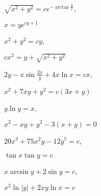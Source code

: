 \documentclass[11pt]{amsbook}
\begin{document}
\begin{hEnumerateArabic}
\item
  \begin{multicols}{2}
    \begin{hEnumerateAlpha}
      \item $\sqrt{x^2 + y^2} = ce^{-\arctan \frac{y}{x}}$,
      \item $x = ye^{cy+1}$
    \end{hEnumerateAlpha}
  \end{multicols}

\item
  \begin{multicols}{2}
    \begin{hEnumerateAlpha}
      \item $x^2 + y^2 = cy$,
      \item $cx^2 = y + \sqrt{x^2 + y^2}$
    \end{hEnumerateAlpha}
  \end{multicols}

\item
  \begin{multicols}{2}
    \begin{hEnumerateAlpha}
      \item $2y - x\sin\frac{2x}{y} + 4x\ln x = cx$,
      \item $x^2 + 7xy + y^2 = c(3x + y)$
    \end{hEnumerateAlpha}
  \end{multicols}

\item
  \begin{multicols}{2}
    \begin{hEnumerateAlpha}
      \item $y\ln y = x$,
      \item $x^2 - xy + y^2 - 3(x + y) = 0$
    \end{hEnumerateAlpha}
  \end{multicols}

\item
  \begin{multicols}{2}
    \begin{hEnumerateAlpha}
      \item $20x^3 + 75x^2y - 12y^5 = c$,
      \item $\tan x\tan y = c$
    \end{hEnumerateAlpha}
  \end{multicols}

\item
  \begin{multicols}{2}
    \begin{hEnumerateAlpha}
      \item $x\arcsin y + 2\sin y = c$,
      \item $x^2\ln|y| + 2xy\ln x = c$
    \end{hEnumerateAlpha}
  \end{multicols}


\end{hEnumerateArabic}
\end{document}

